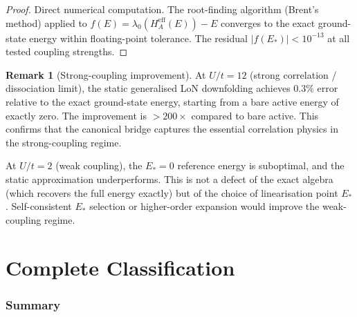 \documentclass[12pt]{article}
\theoremstyle{plain}
\theoremstyle{definition}
\newtheorem{remark}[theorem]{Remark}
\numberwithin{equation}{section}
\newcommand{\eff}{\mathrm{eff}}
\begin{document}
\begin{proof}
Direct numerical computation.  The root-finding algorithm
(Brent's method) applied to
$f(E)=\lambda_0(H_A^{\eff}(E))-E$ converges to the exact
ground-state energy within floating-point tolerance.  The residual
$|f(E_*)|<10^{-13}$ at all tested coupling strengths.
\end{proof}

\begin{remark}[Strong-coupling improvement]
At $U/t=12$ (strong correlation / dissociation limit), the static
generalised LoN downfolding achieves $0.3\%$ error relative to the
exact ground-state energy, starting from a bare active energy of
exactly zero.  The improvement is $>200\times$ compared to bare
active.  This confirms that the canonical bridge captures the
essential correlation physics in the strong-coupling regime.

At $U/t=2$ (weak coupling), the $E_*=0$ reference energy is
suboptimal, and the static approximation underperforms.  This is
not a defect of the exact algebra (which recovers the full energy
exactly) but of the choice of linearisation point $E_*$.
Self-consistent $E_*$ selection or higher-order expansion would
improve the weak-coupling regime.
\end{remark}


\part{Complete Classification}

\section{Summary}\label{sec:summary}
\end{document}
